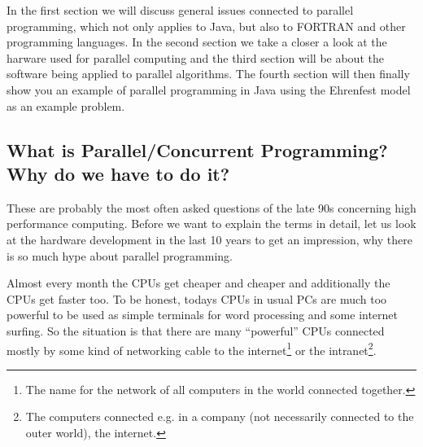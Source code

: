 In the first section we will discuss general issues connected to
parallel programming, which not only applies to Java, but
also to FORTRAN and other programming languages. In the second section
we take a closer a look at the harware used for parallel computing and
the third section will be about the software being applied to
parallel algorithms. The fourth section will then finally show you an
example of parallel programming in Java using the Ehrenfest model as an
example problem.

\subsection{What is Parallel/Concurrent Programming?  \\
            Why do we have to do it?}

These are probably the most often asked questions of the late 90s
concerning high performance computing. 
Before we want to explain the terms in detail, let us look
at the hardware development in the last 10 years to get an impression,
why there is so much hype about parallel programming. 

Almost every month the CPUs get cheaper and cheaper and additionally
the CPUs get faster too. To be honest, todays CPUs in usual PCs
are much too powerful to be used as simple terminals for word 
processing and some internet surfing. So the situation is that
there are many ``powerful'' CPUs connected mostly by some kind
of networking cable to the internet\footnote{The name for the network of
all computers in the world connected together.} 
or the intranet\footnote{The computers connected e.g. in a company 
(not necessarily connected to the outer world), the internet.}.

